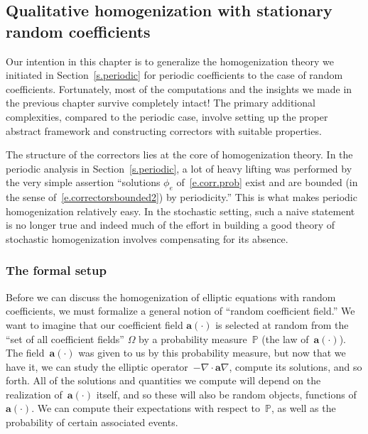 \documentclass[11pt]{article} %
\numberwithin{equation}{section}
\theoremstyle{definition}
\renewcommand{\a}{\mathbf{a}}
\renewcommand{\P}{\mathbb{P}}
\begin{document}
\subsection{Qualitative homogenization with stationary random coefficients}
\label{ss.random}

Our intention in this chapter is to generalize the homogenization theory we initiated in Section~\ref{s.periodic} for periodic coefficients to the case of random coefficients. 
Fortunately, most of the computations and the insights we made in the previous chapter survive completely intact! 
The primary additional complexities, compared to the periodic case, involve setting up the proper abstract framework and constructing correctors with suitable properties. 



The structure of the correctors lies at the core of homogenization theory. In the periodic analysis in Section~\ref{s.periodic}, a lot of heavy lifting was performed by the very simple assertion ``solutions $\phi_e$ of~\eqref{e.corr.prob} exist and are bounded (in the sense of~\eqref{e.correctorsbounded2}) by periodicity.'' This is what makes periodic homogenization relatively easy. In the stochastic setting, such a naive statement is no longer true and indeed much of the effort in building a good theory of stochastic homogenization involves compensating for its absence. 

\smallskip

\subsubsection{The formal setup}

Before we can discuss the homogenization of elliptic equations with random coefficients, we must formalize a general notion of ``random coefficient field.'' We want to imagine that our coefficient field $\a(\cdot)$ is selected at random from the ``set of all coefficient fields'' $\Omega$ by a probability measure~$\mathbb{P}$ (the law of~$\a(\cdot)$). The field~$\a(\cdot)$ was given to us by this probability measure, but now that we have it, we can study the elliptic operator~$-\nabla \cdot \a\nabla$, compute its solutions, and so forth. All of the solutions and quantities we compute will depend on the realization of~$\a(\cdot)$ itself, and so these will also be random objects, functions of~$\a(\cdot)$. We can compute their expectations with respect to~$\P$, as well as the probability of certain associated events. 
\end{document}
